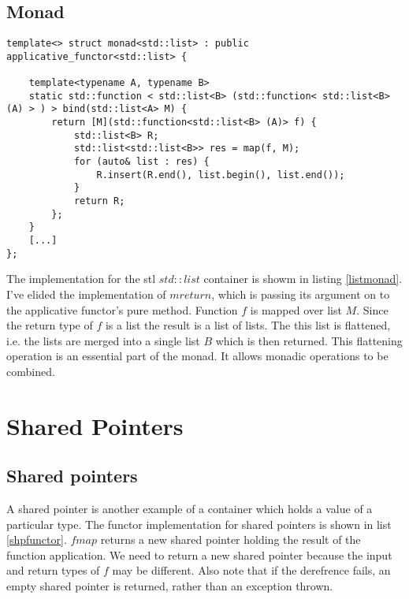 \documentclass[12pt,fleqn]{article}
\begin{document}
%
%
\subsection{Monad}
%
  
  
%
%
%
\begin{minipage}{\linewidth}
\begin{lstlisting}[caption=monad for std::list, label=listmonad]
template<> struct monad<std::list> : public applicative_functor<std::list> {

	template<typename A, typename B>
	static std::function < std::list<B> (std::function< std::list<B> (A) > ) > bind(std::list<A> M) {
		return [M](std::function<std::list<B> (A)> f) {
			std::list<B> R;
			std::list<std::list<B>> res = map(f, M);
			for (auto& list : res) {
				R.insert(R.end(), list.begin(), list.end());
			}
			return R;
		};
	}
    [...]
};
\end{lstlisting}
\end{minipage}
%
%
%
The implementation for the stl $std::list$ container is showm in listing \ref{listmonad}.
I've elided the implementation of $mreturn$, which is passing its argument on to the applicative functor's pure method.
Function $f$ is mapped over list $M$. Since the return type of $f$ is a list the result is a list of lists.
The this list is flattened, i.e. the lists are merged into a single list $B$ which is then returned.
This flattening operation is an essential part of the monad. It allows monadic operations to be combined.

\section{Shared Pointers}

  

\subsection{Shared pointers}
%
%
%

A shared pointer is another example of a container which holds a value of a particular type.
The functor implementation for shared pointers is shown in list \ref{shpfunctor}. 
$fmap$ returns a new shared pointer holding the result of the function application.
We need to return a new shared pointer because the input and return types of $f$ may be different. 
Also note that if the derefrence fails, an empty shared pointer is returned, rather than an exception thrown.
\end{document}

